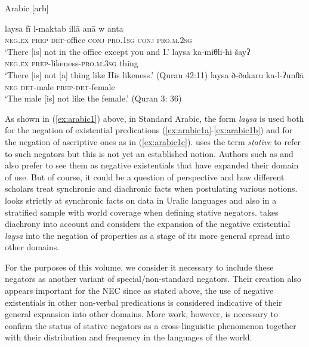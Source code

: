 \documentclass[output=paper,chinesefont,colorlinks,citecolor=brown]{langscibook}
\begin{document}
\begin{exe}
\ex Arabic [arb]  \label{ex:arabic1}
\begin{xlist}
\ex \label{ex:arabic1a}
\gll laysa fī l-maktab illā anā w anta\\
\textsc{neg.ex} \textsc{prep} \textsc{det}-office \textsc{conj} \textsc{pro.1sg} \textsc{conj} \textsc{pro.m.2sg}\\
\glt ‘There [is] not in the office except you and I.’ \citep[273]{adwan2000a}
\ex \label{ex:arabic1b}
\gll laysa ka-miθli-hi šayʔ\\
\textsc{neg.ex} \textsc{prep}-likeness-\textsc{pro.m.3sg} thing\\
 \glt ‘There [is] not [a] thing like His likeness.’ (Quran 42:11)
 \ex \label{ex:arabic1c}
 \gll laysa ð-ðakaru ka-l-ʔunθā\\
 \textsc{neg} \textsc{det}-male \textsc{prep-det}-female\\
 \glt ‘The male [is] not like the female.’ (Quran 3: 36)
\end{xlist}
\end{exe}
As shown in (\ref{ex:arabic1}) above, in Standard Arabic, the form \textit{laysa} is used both for the negation of existential predications (\ref{ex:arabic1a}-\ref{ex:arabic1b}) and for the negation of ascriptive ones as in (\ref{ex:arabic1c}). \citet[572]{Veselinova2015} uses the term \textit{stative} to refer to such negators but this is not yet an established notion. Authors such as \citet[281]{eriksen2011} and also  prefer to see them as negative existentials that have expanded their domain of use. But of course, it could be a question of perspective and how different scholars treat synchronic and diachronic facts when postulating various notions. \citet{Veselinova2015} looks strictly at synchronic facts on data in Uralic languages and also in a stratified sample with world coverage when defining stative negators.  takes diachrony into account and considers the expansion of the negative existential \textit{laysa} into the negation of properties as a stage of its more general spread into other domains.

For the purposes of this volume, we consider it necessary to include these negators as another variant of special{\slash}non-standard negators. Their creation also appears important for the NEC since as stated above, the use of negative existentials in other non-verbal predications is considered indicative of their general expansion into other domains. More work, however, is necessary to confirm the status of stative negators as a cross-linguistic phenomenon together with their distribution and frequency in the languages of the world.
\end{document}
